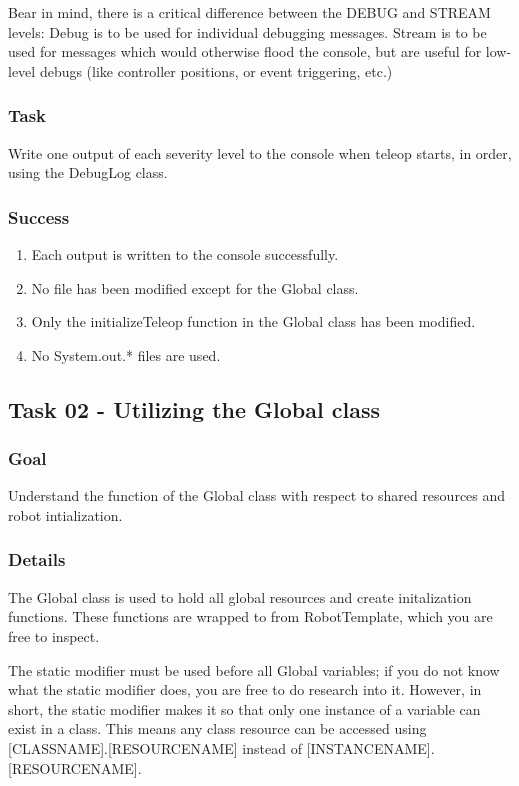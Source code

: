 \documentclass[a4paper]{article}
\begin{document}
Bear in mind, there is a critical difference between the DEBUG and STREAM levels: Debug is to be used for individual debugging messages. Stream is to be used for messages which would otherwise flood the console, but are useful for low-level debugs (like controller positions, or event triggering, etc.)
\subsubsection{Task} Write one output of each severity level to the console when teleop starts, in order, using the DebugLog class.
\subsubsection{Success} \begin{enumerate}\item{Each output is written to the console successfully.}\item{No file has been modified except for the Global class.}\item{Only the initializeTeleop function in the Global class has been modified.}\item{No System.out.* files are used.}\end{enumerate}

\subsection{Task 02 - Utilizing the Global class}
\subsubsection{Goal} Understand the function of the Global class with respect to shared resources and robot intialization.
\subsubsection{Details} The Global class is used to hold all global resources and create initalization functions. These functions are wrapped to from RobotTemplate, which you are free to inspect.

The static modifier must be used before all Global variables; if you do not know what the static modifier does, you are free to do research into it. However, in short, the static modifier makes it so that only one instance of a variable can exist in a class. This means any class resource can be accessed using [CLASSNAME].[RESOURCENAME] instead of [INSTANCENAME].[RESOURCENAME].
\end{document}
